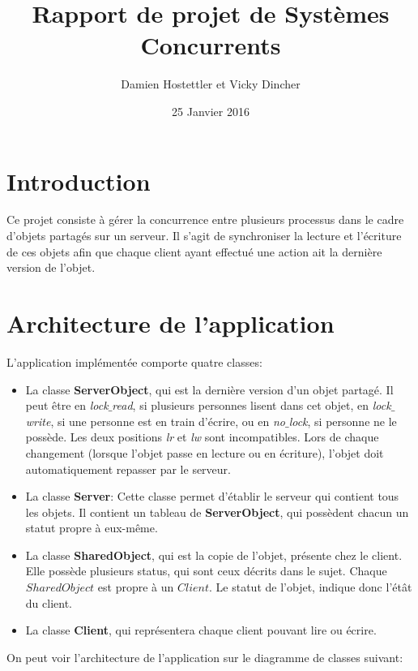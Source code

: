 \documentclass[11pt,a4paper]{report}
\author{Damien Hostettler et Vicky Dincher}
\title{Rapport de projet de Systèmes Concurrents}
\date{25 Janvier 2016}
\begin{document}
\maketitle
\tableofcontents
\newpage
 
\section*{Introduction}

Ce projet consiste à gérer la concurrence entre plusieurs processus dans le cadre d'objets partagés sur un serveur. Il s'agit de synchroniser la lecture et l'écriture de ces objets afin que chaque client ayant effectué une action ait la dernière version de l'objet. 

\section{Architecture de l'application}

L'application implémentée comporte quatre classes:
\begin{itemize}
\item La classe \textbf{ServerObject}, qui est la dernière version d'un objet partagé. Il peut être en \textit{lock$\_$read}, si plusieurs personnes lisent dans cet objet,  en \textit{lock$\_$write}, si une personne est en train d'écrire, ou en \textit{no$\_$lock}, si personne ne le possède. Les deux positions \textit{lr} et \textit{lw} sont incompatibles. Lors de chaque changement (lorsque l'objet passe en lecture ou en écriture), l'objet doit automatiquement repasser par le serveur.
\item La classe \textbf{Server}: Cette classe permet d'établir le serveur qui contient tous les objets. Il contient un tableau de \textbf{ServerObject}, qui possèdent chacun un statut propre à eux-même. 
\item La classe \textbf{SharedObject}, qui est la copie de l'objet, présente chez le client. Elle possède plusieurs status, qui sont ceux décrits dans le sujet. Chaque $SharedObject$ est propre à un $Client$. Le statut de l'objet, indique donc l'étât du client.
\item La classe \textbf{Client}, qui représentera chaque client pouvant lire ou écrire.
\end{itemize}
On peut voir l'architecture de l'application sur le diagramme de classes suivant:
\end{document}
